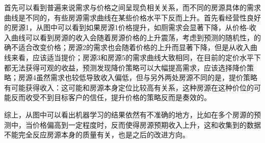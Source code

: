 \documentclass{article}
\begin{document}
\begin{multicols}{2}
\par 首先可以看到普遍来说需求与价格之间呈现负相关关系，而不同的房源具体的需求曲线是不同的，有些房源需求曲线在某些价格水平下反而上升。首先看经营性良好的房源1，从图中可以看到如果房源1价格提升，如厕需求会显著下降，从价格-收入曲线可以看到房源的收入会随着房源价格的上升震荡，考虑到预测的随机性，的确不适合改变价格；房源2的需求也会随着价格的上升而显著下降，但是从收入曲线来看，应该适当提价；房源3和房源5的需求曲线大致相同，在目前的定价水平下都无法获得可观的收益，预测发现降价策略可以大幅提高需求，应该选择降价策略；房源4虽然需求也较低导致收入偏低，但与另外两处房源不同的是，提价策略有可能获得收入：这可能和房源本身定位比较高有关系，这种房源在这种价位的可能反而收受不到目标客户的信任，提升价格的策略反而是奏效的。
\par 综上，从图中可以看出机器学习的结果依然有不准确的地方，比如在多个房源的预测中，当价格偏高到一定程度时，反而使得房源预期收入上升，这和收集到的数据不能完全反应房源本身的质量有关，也是之后的改进方向。

\end{multicols}
\end{document}
